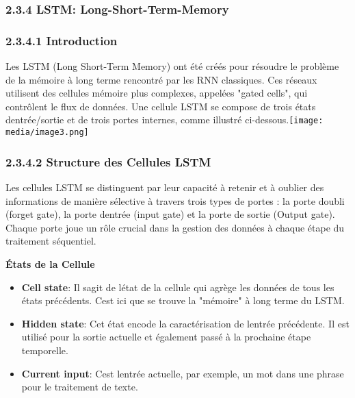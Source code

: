 \documentclass[
]{article}
\begin{document}
\subsubsection{2.3.4 LSTM:
Long-Short-Term-Memory}\label{lstm-long-short-term-memory}

\subsubsection{2.3.4.1 Introduction}\label{introduction-3}

Les LSTM (Long Short-Term Memory) ont été créés pour résoudre le
problème de la mémoire à long terme rencontré par les RNN classiques.
Ces réseaux utilisent des cellules mémoire plus complexes, appelées
"gated cells", qui contrôlent le flux de données. Une cellule LSTM se
compose de trois états d\textquotesingle entrée/sortie et de trois
portes internes, comme illustré
ci-dessous.\texttt{[image: media/image3.png]}

\subsubsection{2.3.4.2 Structure des Cellules
LSTM}\label{structure-des-cellules-lstm}

Les cellules LSTM se distinguent par leur capacité à retenir et à
oublier des informations de manière sélective à travers trois types de
portes : la porte d\textquotesingle oubli (forget gate), la porte
d\textquotesingle entrée (input gate) et la porte de sortie (Output
gate). Chaque porte joue un rôle crucial dans la gestion des données à
chaque étape du traitement séquentiel.

\textbf{États de la Cellule}

\begin{itemize}
\item
  \textbf{Cell state}: Il s\textquotesingle agit de
  l\textquotesingle état de la cellule qui agrège les données de tous
  les états précédents. C\textquotesingle est ici que se trouve la
  "mémoire" à long terme du LSTM.
\item
  \textbf{Hidden state}: Cet état encode la caractérisation de
  l\textquotesingle entrée précédente. Il est utilisé pour la sortie
  actuelle et également passé à la prochaine étape temporelle.
\item
  \textbf{Current input}: C\textquotesingle est l\textquotesingle entrée
  actuelle, par exemple, un mot dans une phrase pour le traitement de
  texte.
\end{itemize}
\end{document}
